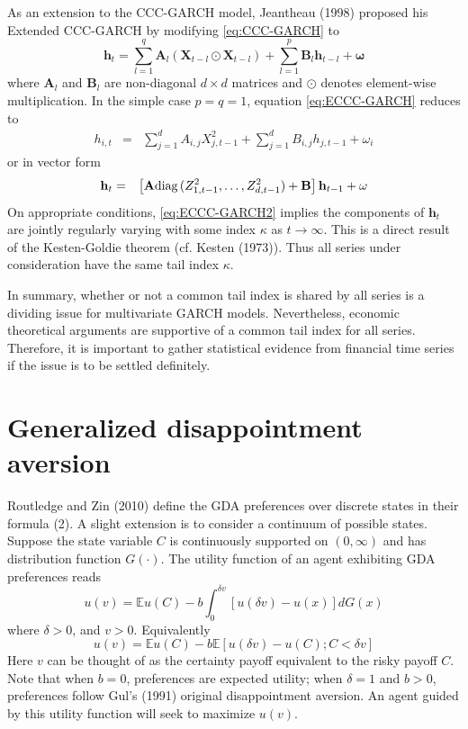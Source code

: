 \documentclass{article}
\newcommand{\E}{
  \mathbb{E}
}
\newcommand{\1}[1]{
  \mathbf{1}_{\{#1\}}
}
\newcommand{\diag}{
  \text{diag\,}
}
\renewcommand\vec[1]{
  \mathbf{#1}
}
\newcommand\mtx[1]{
  \mathbf{#1}
}
\begin{document}
As an extension to the CCC-GARCH model, Jeantheau (1998)
\cite{jeantheau1998strong} proposed his Extended CCC-GARCH by
modifying \eqref{eq:CCC-GARCH} to
\begin{equation}
  \label{eq:ECCC-GARCH}
  \vec h_t =
  \sum_{l=1}^q \mtx A_{l} (\vec X_{t-l} \odot \vec X_{t-l})
  +
  \sum_{l=1}^p \mtx B_{l} \vec h_{t-l}
  +
  \vec \omega
\end{equation}
where $\mtx A_l$ and $\mtx B_l$ are non-diagonal $d \times d$ matrices
and $\odot$ denotes element-wise multiplication. In the simple case $p=q=1$,
equation \eqref{eq:ECCC-GARCH} reduces to
\begin{eqnarray*}
  h_{i,t} &=&
  \sum_{j=1}^d A_{i,j} X_{j, t-1}^2
  + \sum_{j=1}^d B_{i,j} h_{j, t-1}
  + \omega_i
\end{eqnarray*}
or in vector form
\begin{eqnarray}
  \vec h_t &=& \left[
    \mtx A \diag(Z_{1, t-1}^2, \dots, Z_{d, t-1}^2) + \mtx B
    \right] \vec h_{t-1} + \vec \omega
  \label{eq:ECCC-GARCH2}
\end{eqnarray}
On appropriate conditions, \eqref{eq:ECCC-GARCH2} implies the
components of $\vec h_t$ are jointly regularly varying with some index
$\kappa$ as $t \to \infty$. This is a direct result of the Kesten-Goldie
theorem (cf. Kesten (1973)\cite{Kesten1973}). Thus all series under
consideration have the same tail index $\kappa$.

In summary, whether or not a common tail index is shared by all
series is a dividing issue for multivariate GARCH
models. Nevertheless, economic theoretical arguments are supportive of
a common tail index for all series. Therefore, it is important to
gather statistical evidence from financial time series if the issue is
to be settled definitely.

\section{Generalized disappointment aversion}
\label{sec:GDA}
Routledge and Zin (2010) \cite{routledge2010generalized} define the GDA
preferences over discrete states in their formula (2). A slight extension
is to consider a continuum of possible states. Suppose the state variable
$C$ is continuously supported on $(0, \infty)$ and has distribution
function $G(\cdot)$. The utility function of an agent exhibiting GDA
preferences reads
\begin{equation}
  u(v)= \E u(C) - b \int_{0}^{\delta v}
  \left[ u(\delta v) - u(x) \right] dG(x)\label{11}%
\end{equation}
where $\delta > 0$, and $v>0$. Equivalently
\begin{equation}
  \label{eq:xxie0}
  u(v) = \E u(C) - b \E[u(\delta v) - u(C); C < \delta v]
\end{equation}
Here $v$ can be thought of as the certainty payoff equivalent to the
risky payoff $C$. Note that when $b=0$, 
preferences are expected utility; when $\delta=1$ and $b>0$,
preferences follow Gul's (1991) original disappointment aversion.
An agent guided by this utility function will seek to maximize $u(v)$.
\end{document}
